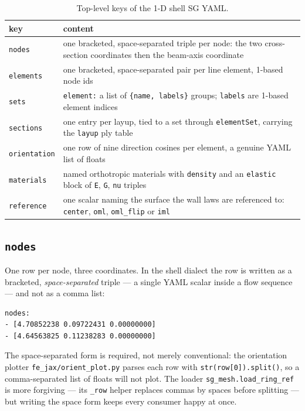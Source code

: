 \begin{table}[htbp]
\centering
\small
\caption{Top-level keys of the 1-D shell SG YAML.}
\label{tab:input-shell-keys}
\begin{tabular}{@{}lp{10.2cm}@{}}
\toprule
key & content \\
\midrule
\texttt{nodes} & one bracketed, space-separated triple per node:
  the two cross-section coordinates then the beam-axis coordinate \\
\texttt{elements} & one bracketed, space-separated pair per line element,
  1-based node ids \\
\texttt{sets} & \texttt{element:} a list of \texttt{\{name, labels\}} groups;
  \texttt{labels} are 1-based element indices \\
\texttt{sections} & one entry per layup, tied to a set through
  \texttt{elementSet}, carrying the \texttt{layup} ply table \\
\texttt{orientation} & one row of nine direction cosines per element,
  a genuine YAML list of floats \\
\texttt{materials} & named orthotropic materials with \texttt{density} and an
  \texttt{elastic} block of \texttt{E}, \texttt{G}, \texttt{nu} triples \\
\texttt{reference} & one scalar naming the surface the wall laws are referenced
  to: \texttt{center}, \texttt{oml}, \texttt{oml\_flip} or \texttt{iml} \\
\bottomrule
\end{tabular}
\end{table}

\subsection{\texttt{nodes}}

One row per node, three coordinates. In the shell dialect the row is written as a
bracketed, \emph{space-separated} triple --- a single YAML scalar inside a flow
sequence --- and not as a comma list:

\begin{lstlisting}[style=shellst,caption={The first two node rows of iea\_s10\_shell.yaml.}]
nodes:
- [4.70852238 0.09722431 0.00000000]
- [4.64563825 0.11238283 0.00000000]
\end{lstlisting}

The space-separated form is required, not merely conventional: the orientation
plotter \texttt{fe\_jax/orient\_plot.py} parses each row with
\texttt{str(row[0]).split()}, so a comma-separated list of floats will not plot.
The loader \texttt{sg\_mesh.load\_ring\_ref} is more forgiving --- its
\texttt{\_row} helper replaces commas by spaces before splitting --- but writing
the space form keeps every consumer happy at once.

